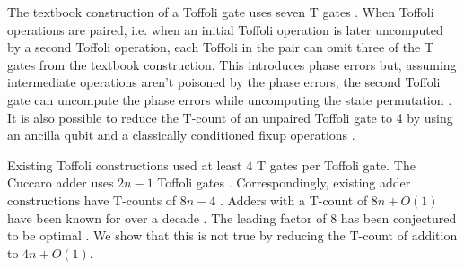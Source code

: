 \documentclass{quantumarticle-customized}
\begin{document}
The textbook construction of a Toffoli gate uses seven T gates \citep{Nielsen2009}.
When Toffoli operations are paired, i.e. when an initial Toffoli operation is later uncomputed by a second Toffoli operation, each Toffoli in the pair can omit three of the T gates from the textbook construction.
This introduces phase errors but, assuming intermediate operations aren't poisoned by the phase errors, the second Toffoli gate can uncompute the phase errors while uncomputing the state permutation \citep{Barenco1995, Nielsen2009}.
It is also possible to reduce the T-count of an unpaired Toffoli gate to 4 by using an ancilla qubit and a classically conditioned fixup operations \citep{Jones2013}.

Existing Toffoli constructions used at least 4 T gates per Toffoli gate.
The Cuccaro adder uses $2n-1$ Toffoli gates \citep{Cuccaro2004}.
Correspondingly, existing adder constructions have T-counts of $8n-4$ \citep{Amy2013}.
Adders with a T-count of $8n + O(1)$ have been known for over a decade \citep{Barenco1995, Cuccaro2004}.
The leading factor of 8 has been conjectured to be optimal \citep{AustinDiscussionsAndEmails2017}.
We show that this is not true by reducing the T-count of addition to $4n + O(1)$.
\end{document}
